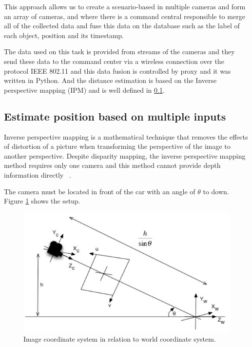 This approach allows us to create a scenario-based in multiple cameras and form an array of cameras, and where there is a command central responsible to merge all of the collected data and fuse this data on the database such as the label of each object, position and its timestamp. 

The data used on this task is provided from streams of the cameras and they send these data to the command center via a wireless connection over the protocol IEEE 802.11 and this data fusion is controlled by proxy and it was written in Python. And the distance estimation is based on the Inverse perspective mapping (IPM) and is well defined in \ref{ipm}.


\subsection{Estimate position based on multiple inputs}\label{ipm}
Inverse perspective mapping is a mathematical technique that removes the effects of distortion of a picture when transforming the perspective of the image to another perspective. Despite disparity mapping, the inverse perspective mapping method requires only one camera and this method cannot provide depth information directly ~\cite{Tuohy2010}.

The camera must be located in front of the car with an angle of \(\theta\) to down. Figure \ref{fig:ImageRelationSystem} shows the setup.

\begin{figure}[h]
\centering
\includegraphics[scale=0.5]{imagens/Inverse Perspective Mapping.JPG}
\caption{Image coordinate system in relation to world coordinate
system.}
\label{fig:ImageRelationSystem}
\end{figure}
\par


